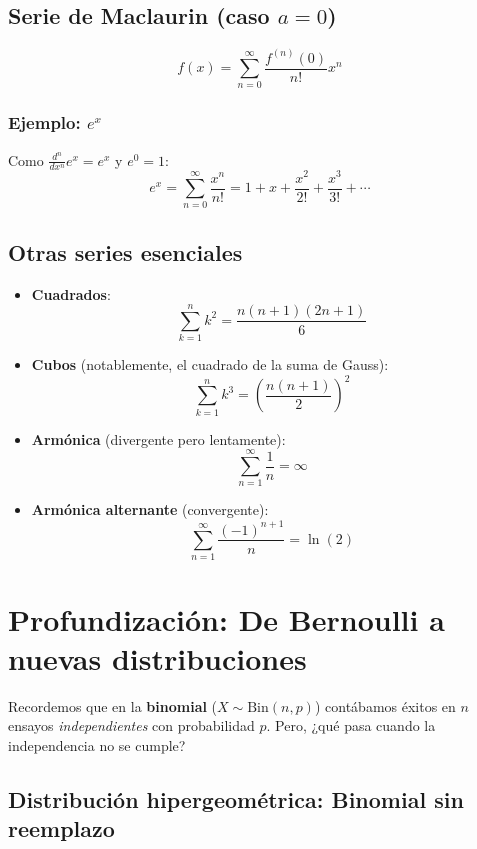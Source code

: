 \documentclass[letterpaper, 12pt]{article}
\begin{document}
	\subsection{Serie de Maclaurin (caso $a=0$)}
	
	\[
	f(x) = \sum_{n=0}^\infty \frac{f^{(n)}(0)}{n!}x^n
	\]
	
	\subsubsection{Ejemplo: $e^x$}
	
	Como $\frac{d^n}{dx^n}e^x = e^x$ y $e^0 = 1$:
	\[
	e^x = \sum_{n=0}^\infty \frac{x^n}{n!} = 1 + x + \frac{x^2}{2!} + \frac{x^3}{3!} + \cdots
	\]
	
	\subsection{Otras series esenciales}
	
	\begin{itemize}
		\item \textbf{Cuadrados}:
		\[
		\sum_{k=1}^n k^2 = \frac{n(n+1)(2n+1)}{6}
		\]
		
		\item \textbf{Cubos} (notablemente, el cuadrado de la suma de Gauss):
		\[
		\sum_{k=1}^n k^3 = \left( \frac{n(n+1)}{2} \right)^2
		\]
	\end{itemize}
	
	\begin{itemize}
		\item \textbf{Armónica} (divergente pero lentamente):
		\[
		\sum_{n=1}^\infty \frac{1}{n} = \infty
		\]
		
		\item \textbf{Armónica alternante} (convergente):
		\[
		\sum_{n=1}^\infty \frac{(-1)^{n+1}}{n} = \ln(2)
		\]
	\end{itemize}
	
	\section{Profundización: De Bernoulli a nuevas distribuciones}
	
	Recordemos que en la \textbf{binomial} ($X \sim \text{Bin}(n,p)$) contábamos éxitos en $n$ ensayos \textit{independientes} con probabilidad $p$. Pero, ¿qué pasa cuando la independencia no se cumple?
	
	\subsection{Distribución hipergeométrica: Binomial sin reemplazo}
	
\end{document}
